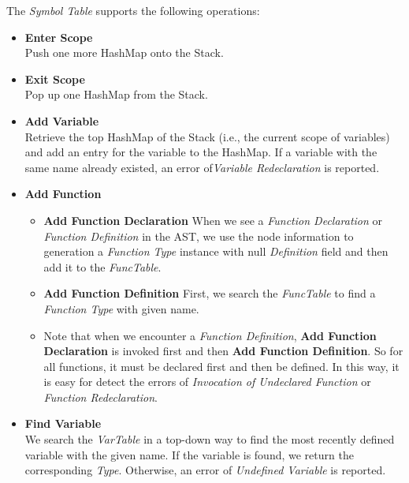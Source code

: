 \documentclass[a4paper,11pt]{article}
\begin{document}
	The \emph{Symbol Table} supports the following operations:
\begin{itemize}
	\item \textbf{Enter Scope}\\
	Push one more HashMap onto the Stack.
	
	\item \textbf{Exit Scope} \\
	Pop up one HashMap from the Stack.
	
	\item \textbf{Add Variable} \\
	Retrieve the top HashMap of the Stack (i.e., the current scope of variables) and add an entry for the variable to the HashMap. If a variable with the same name already existed, an error of\emph{Variable Redeclaration} is reported.
	
	\item \textbf{Add Function} 
	\begin{itemize}
		\item \textbf{Add Function Declaration}
			When we see a \emph{Function Declaration} or \emph{Function Definition} in the AST, we use the node information to generation a \emph{Function Type} instance with null \emph{Definition} field and then add it to the \emph{FuncTable}.
		\item \textbf{Add Function Definition}
			First, we search the \emph{FuncTable} to find a \emph{Function Type} with given name. 
		\item Note that when we encounter a \emph{Function Definition}, \textbf{Add Function Declaration} is invoked first and then \textbf{Add Function Definition}. So for all functions, it must be declared first and then be defined. In this way, it is easy for detect the errors of \textit{Invocation of Undeclared Function} or \textit{Function Redeclaration}.
	\end{itemize}
	
	\item \textbf{Find Variable} \\
	We search the \emph{VarTable} in a top-down way to find the most recently defined variable with the given name. If the variable is found, we return the corresponding \emph{Type}. Otherwise, an error of \textit{Undefined Variable} is reported.
	

\end{itemize}
\end{document}
